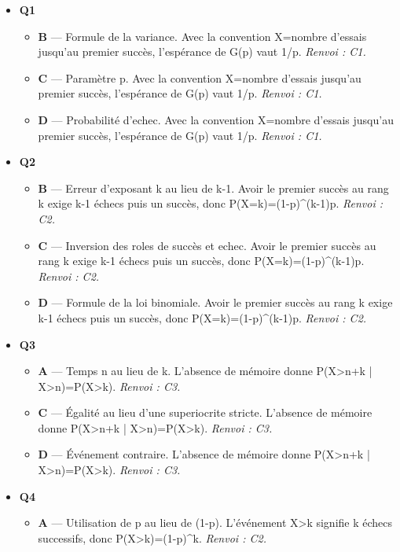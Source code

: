\begin{itemize}
  \item \textbf{Q1}
  \begin{itemize}
    \item \textbf{B} — Formule de la variance. Avec la convention X=nombre d'essais jusqu'au premier succès, l'espérance de G(p) vaut 1/p. \emph{Renvoi : C1.}
    \item \textbf{C} — Paramètre p. Avec la convention X=nombre d'essais jusqu'au premier succès, l'espérance de G(p) vaut 1/p. \emph{Renvoi : C1.}
    \item \textbf{D} — Probabilité d'echec. Avec la convention X=nombre d'essais jusqu'au premier succès, l'espérance de G(p) vaut 1/p. \emph{Renvoi : C1.}
  \end{itemize}
  \item \textbf{Q2}
  \begin{itemize}
    \item \textbf{B} — Erreur d'exposant k au lieu de k-1. Avoir le premier succès au rang k exige k-1 échecs puis un succès, donc P(X=k)=(1-p)\textasciicircum{}(k-1)p. \emph{Renvoi : C2.}
    \item \textbf{C} — Inversion des roles de succès et echec. Avoir le premier succès au rang k exige k-1 échecs puis un succès, donc P(X=k)=(1-p)\textasciicircum{}(k-1)p. \emph{Renvoi : C2.}
    \item \textbf{D} — Formule de la loi binomiale. Avoir le premier succès au rang k exige k-1 échecs puis un succès, donc P(X=k)=(1-p)\textasciicircum{}(k-1)p. \emph{Renvoi : C2.}
  \end{itemize}
  \item \textbf{Q3}
  \begin{itemize}
    \item \textbf{A} — Temps n au lieu de k. L'absence de mémoire donne P(X>n+k | X>n)=P(X>k). \emph{Renvoi : C3.}
    \item \textbf{C} — Égalité au lieu d'une superiocrite stricte. L'absence de mémoire donne P(X>n+k | X>n)=P(X>k). \emph{Renvoi : C3.}
    \item \textbf{D} — Événement contraire. L'absence de mémoire donne P(X>n+k | X>n)=P(X>k). \emph{Renvoi : C3.}
  \end{itemize}
  \item \textbf{Q4}
  \begin{itemize}
    \item \textbf{A} — Utilisation de p au lieu de (1-p). L'événement X>k signifie k échecs successifs, donc P(X>k)=(1-p)\textasciicircum{}k. \emph{Renvoi : C2.}

\end{itemize}
\end{itemize}

